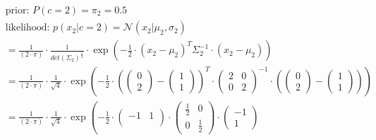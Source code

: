 \documentclass[12pt]{article}
\begin{document}
\begin{enumerate}
\begin{itemize}[label=]
            \begin{equation*}
                \begin{aligned}
                    &\text{prior: } P(c=2) = \pi_2 = \mathbf{0.5} \\
                    &\text{likelihood: } p(x_2|c=2) = \mathcal{N}(x_2| \mu_2, \sigma_2) \\
                    &= \frac{1}{(2 \cdot \pi)} \cdot \frac{1}{det(\Sigma_2)^\frac{1}{2}} \cdot \exp \left( -\frac{1}{2} \cdot (x_2 - \mu_2)^{T} \Sigma_2^{-1} \cdot (x_2 - \mu_2) \right)\\
                    &= \frac{1}{(2 \cdot \pi)} \cdot \frac{1}{\sqrt{4}} \cdot \exp \left( -\frac{1}{2} \cdot \left(\begin{pmatrix}
                    0\\
                    2
                    \end{pmatrix} - \begin{pmatrix}
                    1\\
                    1
                    \end{pmatrix}\right)^{T} \cdot \begin{pmatrix}
                    2 & 0\\
                    0 & 2
                    \end{pmatrix}^{-1} \cdot \left(\begin{pmatrix}
                    0\\
                    2
                    \end{pmatrix} - \begin{pmatrix}
                    1\\
                    1
                    \end{pmatrix}\right) \right)\\
                    &= \frac{1}{(2 \cdot \pi)} \cdot \frac{1}{\sqrt{4}} \cdot \exp \left( -\frac{1}{2} \cdot \begin{pmatrix}
                    -1 & 1\\
                    \end{pmatrix} \cdot \begin{pmatrix}
                    \frac{1}{2} & 0\\
                    0 & \frac{1}{2}
                    \end{pmatrix} \cdot \begin{pmatrix}
                    -1\\
                    1

\end{pmatrix}
\end{aligned}
\end{equation*}
\end{itemize}
\end{enumerate}
\end{document}
